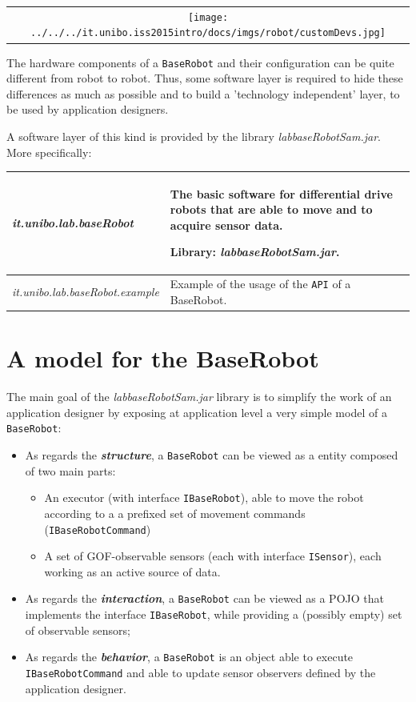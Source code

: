 \begin{center}
\begin{tabular}{ c }
     \texttt{[image: ../../../it.unibo.iss2015intro/docs/imgs/robot/customDevs.jpg]}\\
\end{tabular} 
\end{center}


The hardware components of a \texttt{BaseRobot} and their configuration can be quite different from robot to robot. Thus, some software layer is required to hide these differences as much as possible and to build a 'technology independent' layer, to be used by application designers.

A software layer of this kind is provided by the library \textit{labbaseRobotSam.jar}. More specifically:  


\medskip 
\noindent 
\begin{tabular}{|p{}|p{}|}
\hline 
\textit{it.unibo.lab.baseRobot } 
&The basic software for differential drive robots that are able to move and to acquire sensor data. 

\medskip 
Library: \textit{labbaseRobotSam.jar}. 
\\ 
\hline 
\textit{it.unibo.lab.baseRobot.example} 
&Example of the usage of the \texttt{API} of a BaseRobot.
\\ 
\hline 
\end{tabular} 


\section{A model for the BaseRobot}

The main goal of the \textit{labbaseRobotSam.jar} library is to simplify the work of an application designer by exposing at application level a very simple model of a \texttt{BaseRobot}:

\begin{itemize}
\item As regards the \textbf{\textit{structure}}, a \texttt{BaseRobot} can be viewed as a entity composed of two main parts:
\begin{itemize}
\item An executor (with interface \texttt{IBaseRobot}), able to move the robot according to a  a prefixed set of movement commands (\texttt{IBaseRobotCommand}) 
\item A set of GOF-observable sensors (each with interface \texttt{ISensor}), each working as an active source of data.
\end{itemize}
\item As regards the \textbf{\textit{interaction}}, a \texttt{BaseRobot} can be viewed as a POJO that implements the interface \texttt{IBaseRobot}, while providing a (possibly empty) set of observable sensors;
\item  As regards the \textbf{\textit{behavior}}, a \texttt{BaseRobot} is an object able to execute \texttt{IBaseRobotCommand} and able to update sensor observers defined by the application designer.
\end{itemize}



